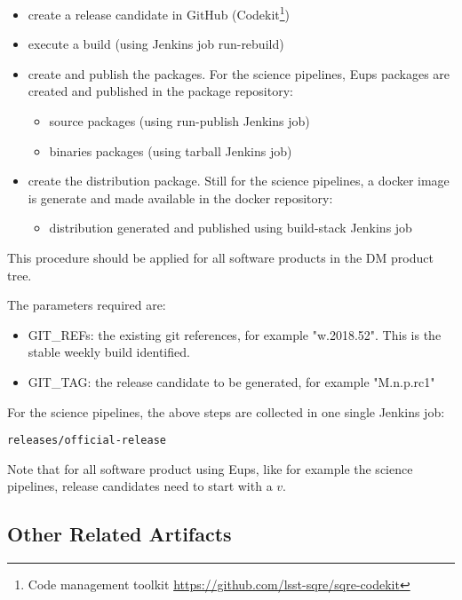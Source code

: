 \begin{itemize}
\item create a release candidate in GitHub (Codekit\footnote{Code management toolkit \url{https://github.com/lsst-sqre/sqre-codekit}})
\item execute a build (using Jenkins job run-rebuild)
\item create and publish the packages. For the science pipelines, Eups packages are created and published in the package repository:
   \begin{itemize}
   \item source packages (using run-publish Jenkins job)
   \item binaries packages (using tarball Jenkins job)
   \end{itemize}
\item create the distribution package. Still for the science pipelines, a docker image is generate and made available in the docker repository:
   \begin{itemize}
   \item distribution generated and published using build-stack Jenkins job
   \end{itemize}
\end{itemize}


This procedure should be applied for all software products in the DM product tree.

The parameters required are:
\begin{itemize}
\item GIT\_REFs: the existing git references, for example "w.2018.52". This is the stable weekly build identified.
\item GIT\_TAG: the release candidate to be generated, for example "M.n.p.rc1"
\end{itemize}

For the science pipelines, the above steps are collected in one single Jenkins job:
 
\begin{verbatim}
releases/official-release
\end{verbatim}

Note that for all software product using Eups, like for example the science pipelines, release candidates need to start with a $v$.

\subsection{Other Related Artifacts}

